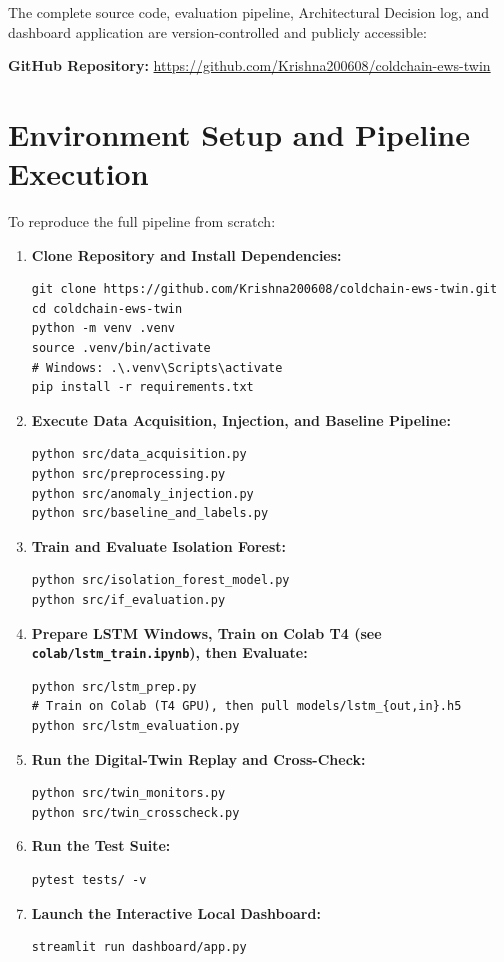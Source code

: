 \documentclass[11pt,a4paper,oneside]{report}
\begin{document}
The complete source code, evaluation pipeline, Architectural Decision log, and dashboard application are version-controlled and publicly accessible:

\begin{center}
\textbf{GitHub Repository:} \url{https://github.com/Krishna200608/coldchain-ews-twin}
\end{center}

\section{Environment Setup and Pipeline Execution}
\label{sec:reproduction}

To reproduce the full pipeline from scratch:

\begin{enumerate}[leftmargin=*,itemsep=3pt]
\item \textbf{Clone Repository and Install Dependencies:}
\begin{verbatim}
git clone https://github.com/Krishna200608/coldchain-ews-twin.git
cd coldchain-ews-twin
python -m venv .venv
source .venv/bin/activate
# Windows: .\.venv\Scripts\activate
pip install -r requirements.txt
\end{verbatim}

\item \textbf{Execute Data Acquisition, Injection, and Baseline Pipeline:}
\begin{verbatim}
python src/data_acquisition.py
python src/preprocessing.py
python src/anomaly_injection.py
python src/baseline_and_labels.py
\end{verbatim}

\item \textbf{Train and Evaluate Isolation Forest:}
\begin{verbatim}
python src/isolation_forest_model.py
python src/if_evaluation.py
\end{verbatim}

\item \textbf{Prepare LSTM Windows, Train on Colab T4 (see \texttt{colab/\allowbreak lstm\_train.ipynb}), then Evaluate:}
\begin{verbatim}
python src/lstm_prep.py
# Train on Colab (T4 GPU), then pull models/lstm_{out,in}.h5
python src/lstm_evaluation.py
\end{verbatim}

\item \textbf{Run the Digital-Twin Replay and Cross-Check:}
\begin{verbatim}
python src/twin_monitors.py
python src/twin_crosscheck.py
\end{verbatim}

\item \textbf{Run the Test Suite:}
\begin{verbatim}
pytest tests/ -v
\end{verbatim}

\item \textbf{Launch the Interactive Local Dashboard:}
\begin{verbatim}
streamlit run dashboard/app.py
\end{verbatim}
\end{enumerate}
\end{document}
